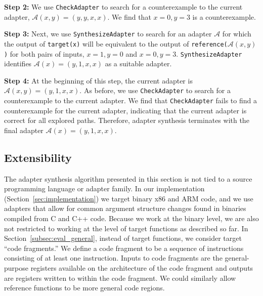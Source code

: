 \textbf{Step 2:} We use \texttt{CheckAdapter} to search for a counterexample to the current adapter, $\mathcal{A}(x,y) = (y,y,x,x)$. We find that $x = 0, y = 3$ is a counterexample. 

\textbf{Step 3:} Next, we use \texttt{SynthesizeAdapter} to search for
an adapter $\mathcal{A}$ for which the output of \texttt{target(x)} will
be equivalent to the output of
\texttt{reference(}$\mathcal{A}(x,y)$\texttt{)} for both pairs of
inputs, $x = 1, y = 0$ and $x = 0, y = 3$. \texttt{SynthesizeAdapter} identifies $\mathcal{A}(x) = (y,1,x,x)$ as a suitable adapter.

\textbf{Step 4:}
At the beginning of this step, the current adapter is $\mathcal{A}(x,y) = (y,1,x,x)$. As before, we use \texttt{CheckAdapter} to search for a counterexample to the current adapter. We find that \texttt{CheckAdapter} fails to find a counterexample for the current adapter, indicating that the current adapter is correct for all explored paths. Therefore, adapter synthesis terminates with the final adapter $\mathcal{A}(x) = (y, 1, x, x)$.

\subsection{Extensibility}

The adapter synthesis algorithm presented in this section is not tied to a source programming language or adapter family.
In our implementation (Section~\ref{sec:implementation}) we target
binary x86 and ARM code, and we use adapters that allow for common
argument structure changes found in binaries compiled from C and C++ code.
Because we work at the binary level, we are also not restricted to working at the level of target functions as described so far.
In Section~\ref{subsec:eval_general}, instead of target functions, we consider target ``code fragments.''
We define a code fragment to be a sequence of instructions consisting of at least one instruction. 
Inputs to code fragments are the general-purpose registers available on the architecture of the code fragment and outputs are registers written to within the code fragment.
%
We could similarly allow reference functions to be more general code regions.

